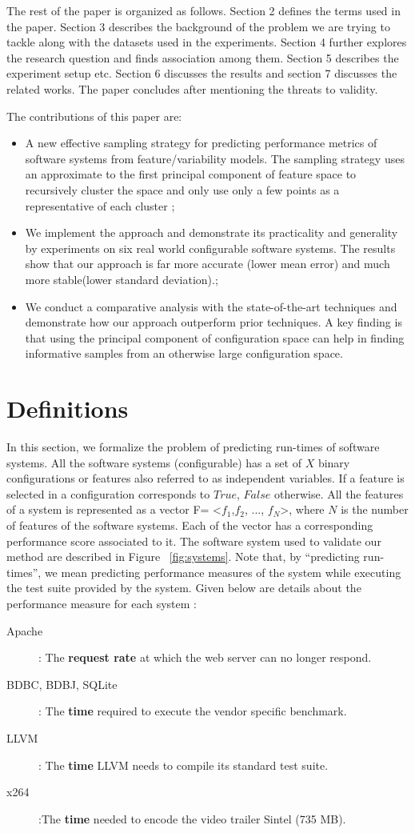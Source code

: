 \documentclass{sig-alternative}
\newcommand{\bi}{\begin{itemize}}%
\newcommand{\ei}{\end{itemize}}
\begin{document}
The rest of the paper is organized as follows. Section 2 defines the terms used in the paper. Section 3 describes the background of the problem we are trying to tackle along with the datasets used in the experiments. Section 4 further explores the research question and finds association among them. Section 5 describes the experiment setup etc. Section 6 discusses the results and section 7 discusses the related works. The paper concludes after mentioning the threats to validity.

The contributions of this paper are:
\bi
\item A new effective sampling strategy for predicting performance metrics of software systems from feature/variability models. The sampling strategy uses an approximate to the first principal component of feature space to recursively cluster the space and only use only a few points as a representative of each cluster ;
\item We implement the approach and demonstrate its practicality and generality by experiments on six real world configurable software systems. The results show that our approach is far more accurate (lower mean error) and much more stable(lower standard deviation).;
\item We conduct a comparative analysis with the state-of-the-art techniques and demonstrate how our approach outperform prior techniques. A key finding is that using the principal component of configuration space can help in finding informative samples from an otherwise large configuration space.
\ei


\section{Definitions}

In this section, we formalize the problem of predicting run-times of software systems. All the software systems (configurable) has a set of $X$ binary configurations or features also referred to as independent  variables. If a feature is selected in a configuration corresponds to $True$,  $False$ otherwise. All the features of a system is represented as a vector F= <$f_1$,$f_2$, ..., $f_N$>, where $N$ is the number of features of the software systems. Each of the vector has a corresponding performance score associated to it. The software system used to validate our method are described in Figure ~\ref{fig:systems}.
Note that, by   ``predicting run-times'', we 
mean predicting performance measures of the system while executing the test suite provided by the system. Given below are details about the performance measure for each system \cite{siegmund2012predicting}:
\begin{description}
\item[Apache]: The \textbf{request rate} at which the web server can no longer respond.
\item[BDBC, BDBJ, SQLite]: The \textbf{time} required to execute the vendor specific benchmark. 
\item[LLVM]: The \textbf{time} LLVM needs to compile its standard test suite. 
\item[x264]:The \textbf{time} needed to encode the video trailer Sintel (735 MB). 
\end{description}
\end{document}
